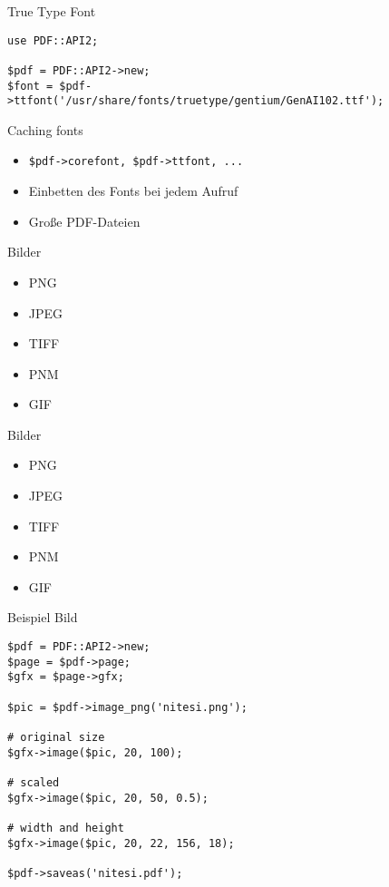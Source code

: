 
\begin{frame}[fragile]{True Type Font}
\begin{lstlisting}
use PDF::API2;

$pdf = PDF::API2->new;
$font = $pdf->ttfont('/usr/share/fonts/truetype/gentium/GenAI102.ttf');
\end{lstlisting}
\end{frame}

\begin{frame}[fragile]{Caching fonts}
\begin{itemize}
\item \begin{verbatim}$pdf->corefont, $pdf->ttfont, ... \end{verbatim} 
\item Einbetten des Fonts bei jedem Aufruf
\item Große PDF-Dateien
\end{itemize}
\end{frame}

\begin{frame}{Bilder}
\begin{itemize}
\item PNG
\item JPEG
\item TIFF
\item PNM
\item GIF
\end{itemize}
\end{frame}

\begin{frame}{Bilder}
\begin{itemize}
\item PNG
\item JPEG
\item TIFF
\item PNM
\item GIF
\end{itemize}
\end{frame}

\begin{frame}[fragile]{Beispiel Bild}
\begin{lstlisting}
$pdf = PDF::API2->new;
$page = $pdf->page;
$gfx = $page->gfx;

$pic = $pdf->image_png('nitesi.png');

# original size
$gfx->image($pic, 20, 100);

# scaled
$gfx->image($pic, 20, 50, 0.5);

# width and height
$gfx->image($pic, 20, 22, 156, 18);

$pdf->saveas('nitesi.pdf');
\end{lstlisting}
\end{frame}

